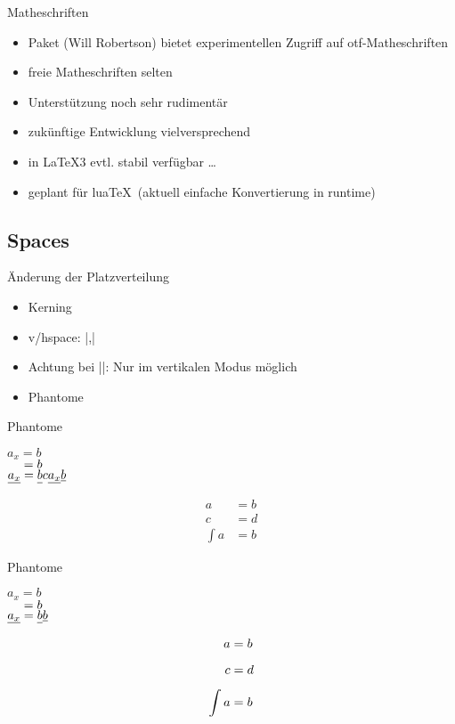 \documentclass[
	vorläufig=false,
	datum=2022-11-09,
	titel={Mathematiksatz},
	web=false,
	max,
	aspectratio=1610,
]{../tex/latexkurs-slides}
\begin{document}
\begin{frame}[fragile]{Matheschriften}
\begin{itemize}
\item Paket  (Will Robertson) bietet experimentellen Zugriff auf otf-Matheschriften
\item freie Matheschriften selten
\item Unterstützung noch sehr rudimentär
\item zukünftige Entwicklung vielversprechend
\item in \LaTeX3 evtl. stabil verfügbar \dots
\item geplant für lua\TeX \, (aktuell einfache Konvertierung in runtime)
\end{itemize}
\end{frame}


\subsection{Spaces}
\begin{frame}[fragile]{Änderung der Platzverteilung}
\begin{itemize}
\item Kerning
\item v/hspace: |\hspace{1cm},\hspace*{1cm}|
\item Achtung bei |\vspace|: Nur im vertikalen Modus möglich
\item Phantome
\end{itemize}
\end{frame}

\begin{frame}[fragile]{Phantome}
\begin{LTXexample}[width=.4\textwidth]
\(a_x = b\)\\
\(\hphantom{a_x} = b\)\\
\(\underline{a_x} = \underline{b\vphantom{a_x}} c \underline{a_x} \underline b\)
\end{LTXexample}
\begin{LTXexample}
\begin{align*}
a &= b\\
c &= d\\
\int a &= b
\end{align*}
\end{LTXexample}
\end{frame}

\begin{frame}[fragile]{Phantome}
\begin{LTXexample}[width=.4\textwidth]
\(a_x = b\)\\
\(\hphantom{a_x} = b\)\\
\(\underline{a_x} = \underline{b\vphantom{a_x}}\underline b\)
\end{LTXexample}
\begin{LTXexample}
\begin{align*}
a &= b\\
\vphantom{\int} c &= d\\
\int a &= b
\end{align*}
\end{LTXexample}
\end{frame}
\end{document}
